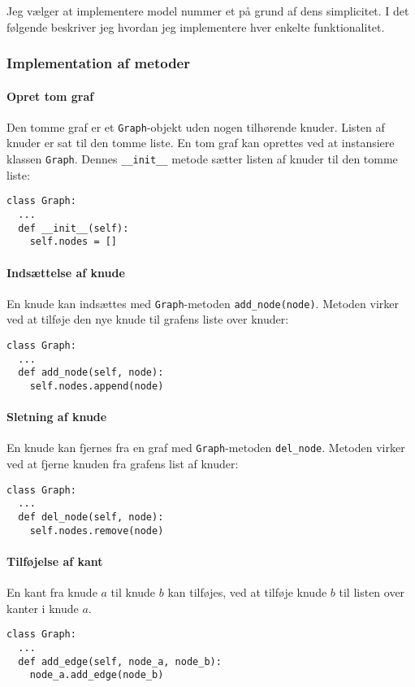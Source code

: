 \documentclass[10pt,a4paper,danish]{article}
\newcommand{\ct}{\texttt}
\begin{document}
Jeg vælger at implementere model nummer et på grund af dens
simplicitet. I det følgende beskriver jeg hvordan jeg implementere
hver enkelte funktionalitet.

\subsubsection{Implementation af metoder}
\paragraph{Opret tom graf}
Den tomme graf er et \ct{Graph}-objekt uden nogen tilhørende
knuder. Listen af knuder er sat til den tomme liste. En tom graf kan
oprettes ved at instansiere klassen \ct{Graph}. Dennes \ct{\_\_init\_\_}
metode sætter listen af knuder til den tomme liste:
{\small
\begin{verbatim}
class Graph:
  ...
  def __init__(self):
    self.nodes = []
\end{verbatim}}

\paragraph{Indsættelse af knude}
En knude kan indsættes med \ct{Graph}-metoden
\ct{add\_node(node)}. Metoden virker ved at tilføje den nye knude til
grafens liste over knuder:
{\small
\begin{verbatim}
class Graph:
  ...
  def add_node(self, node):
    self.nodes.append(node)
\end{verbatim}}

\paragraph{Sletning af knude}
En knude kan fjernes fra en graf med \ct{Graph}-metoden
\ct{del\_node}. Metoden virker ved at fjerne knuden fra grafens list af
knuder:
{\small
\begin{verbatim}
class Graph:
  ...
  def del_node(self, node):
    self.nodes.remove(node)
\end{verbatim}}

\paragraph{Tilføjelse af kant}
En kant fra knude $a$ til knude $b$ kan tilføjes, ved at tilføje knude
$b$ til listen over kanter i knude $a$.

{\small
\begin{verbatim}
class Graph:
  ...
  def add_edge(self, node_a, node_b):
    node_a.add_edge(node_b)
\end{verbatim}}
\end{document}
